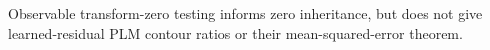 Observable transform-zero testing informs zero inheritance, but does not give learned-residual PLM contour ratios or their mean-squared-error theorem.